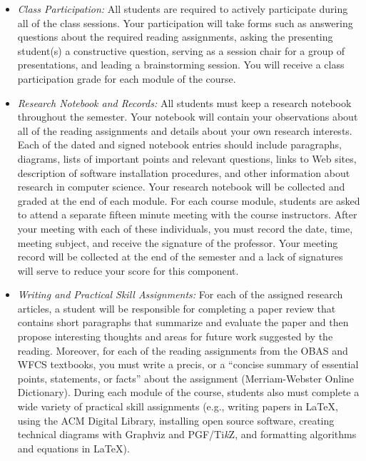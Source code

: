 \begin{itemize}
\item
{\em Class Participation:} All students are required to actively
participate during all of the class sessions. Your participation will
take forms such as answering questions about the required reading
assignments, asking the presenting student(s) a constructive question,
serving as a session chair for a group of presentations, and leading a
brainstorming session. You will receive a class participation grade
for each module of the course.

\item
{\em Research Notebook and Records:} All students must keep a research
notebook throughout the semester. Your notebook will contain your
observations about all of the reading assignments and details about your
own research interests. Each of the dated and signed notebook entries
should include paragraphs, diagrams, lists of important points and
relevant questions, links to Web sites, description of software
installation procedures, and other information about research in
computer science. Your research notebook will be collected and graded at
the end of each module. For each course module, students are asked to
attend a separate fifteen minute meeting with the course instructors.
After your meeting with each of these individuals,
you must record the date, time, meeting subject, and receive the
signature of the professor. Your meeting record will be collected at the
end of the semester and a lack of signatures will serve to reduce your
score for this component.

\item
{\em Writing and Practical Skill Assignments:} For each of the
assigned research articles, a student will be responsible for
completing a paper review that contains short paragraphs that
summarize and evaluate the paper and then propose interesting thoughts
and areas for future work suggested by the reading. Moreover, for each
of the reading assignments from the OBAS and WFCS textbooks, you must
write a precis, or a ``concise summary of essential points,
statements, or facts'' about the assignment (Merriam-Webster Online
Dictionary). During each module of the course, students also must
complete a wide variety of practical skill assignments (e.g., writing
papers in \LaTeX, using the ACM Digital Library, installing open source
software, creating technical diagrams with Graphviz and PGF/Ti\emph{k}Z, and
formatting algorithms and equations in \LaTeX).


\end{itemize}
